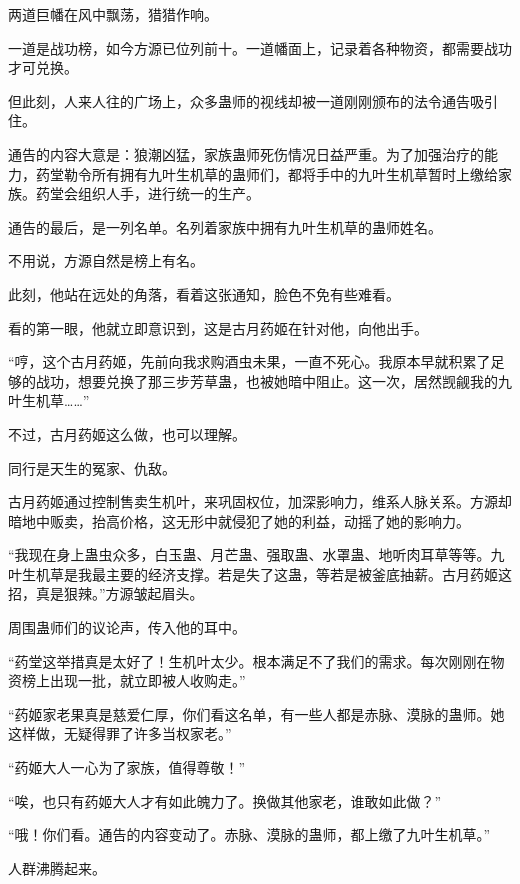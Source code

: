 
\begin{this_body}

两道巨幡在风中飘荡，猎猎作响。

一道是战功榜，如今方源已位列前十。一道幡面上，记录着各种物资，都需要战功才可兑换。

但此刻，人来人往的广场上，众多蛊师的视线却被一道刚刚颁布的法令通告吸引住。

通告的内容大意是：狼潮凶猛，家族蛊师死伤情况日益严重。为了加强治疗的能力，药堂勒令所有拥有九叶生机草的蛊师们，都将手中的九叶生机草暂时上缴给家族。药堂会组织人手，进行统一的生产。

通告的最后，是一列名单。名列着家族中拥有九叶生机草的蛊师姓名。

不用说，方源自然是榜上有名。

此刻，他站在远处的角落，看着这张通知，脸色不免有些难看。

看的第一眼，他就立即意识到，这是古月药姬在针对他，向他出手。

“哼，这个古月药姬，先前向我求购酒虫未果，一直不死心。我原本早就积累了足够的战功，想要兑换了那三步芳草蛊，也被她暗中阻止。这一次，居然觊觎我的九叶生机草……”

不过，古月药姬这么做，也可以理解。

同行是天生的冤家、仇敌。

古月药姬通过控制售卖生机叶，来巩固权位，加深影响力，维系人脉关系。方源却暗地中贩卖，抬高价格，这无形中就侵犯了她的利益，动摇了她的影响力。

“我现在身上蛊虫众多，白玉蛊、月芒蛊、强取蛊、水罩蛊、地听肉耳草等等。九叶生机草是我最主要的经济支撑。若是失了这蛊，等若是被釜底抽薪。古月药姬这招，真是狠辣。”方源皱起眉头。

周围蛊师们的议论声，传入他的耳中。

“药堂这举措真是太好了！生机叶太少。根本满足不了我们的需求。每次刚刚在物资榜上出现一批，就立即被人收购走。”

“药姬家老果真是慈爱仁厚，你们看这名单，有一些人都是赤脉、漠脉的蛊师。她这样做，无疑得罪了许多当权家老。”

“药姬大人一心为了家族，值得尊敬！”

“唉，也只有药姬大人才有如此魄力了。换做其他家老，谁敢如此做？”

“哦！你们看。通告的内容变动了。赤脉、漠脉的蛊师，都上缴了九叶生机草。”

人群沸腾起来。


\end{this_body}
